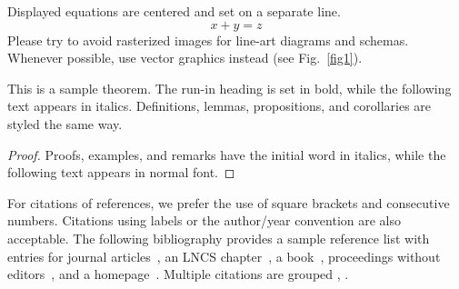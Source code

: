 \documentclass[runningheads]{llncs}
\begin{document}
\noindent Displayed equations are centered and set on a separate
line.
\begin{equation}
x + y = z
\end{equation}
Please try to avoid rasterized images for line-art diagrams and
schemas. Whenever possible, use vector graphics instead (see
Fig.~\ref{fig1}).


\begin{theorem}
This is a sample theorem. The run-in heading is set in bold, while
the following text appears in italics. Definitions, lemmas,
propositions, and corollaries are styled the same way.
\end{theorem}
%
%
\begin{proof}
Proofs, examples, and remarks have the initial word in italics,
while the following text appears in normal font.
\end{proof}
For citations of references, we prefer the use of square brackets
and consecutive numbers. Citations using labels or the author/year
convention are also acceptable. The following bibliography provides
a sample reference list with entries for journal
articles~\cite{ref_article1}, an LNCS chapter~\cite{ref_lncs1}, a
book~\cite{ref_book1}, proceedings without editors~\cite{ref_proc1},
and a homepage~\cite{ref_url1}. Multiple citations are grouped
\cite{ref_article1,ref_lncs1,ref_book1},
\cite{ref_article1,ref_book1,ref_proc1,ref_url1}.
%
%
%
% 
% 
%
\end{document}
